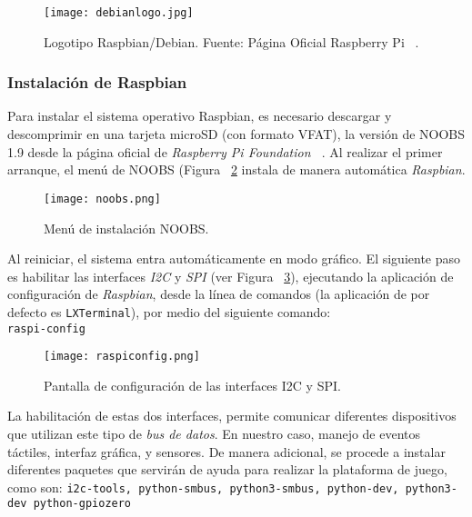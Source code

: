 \begin{figure}[!h]
\begin{center}
\texttt{[image: debianlogo.jpg]}
\caption{Logotipo Raspbian/Debian. Fuente: Página Oficial Raspberry Pi ~\cite{Raspberry}.}
\label{fig:MPU9255_PINOUT}
\end{center}
\end{figure}

\subsubsection{Instalación de Raspbian}
Para instalar el sistema operativo Raspbian, es necesario descargar y descomprimir en una tarjeta microSD (con formato VFAT), la versión de NOOBS 1.9 desde la página oficial de \emph{Raspberry Pi Foundation ~\cite{Noobs}}.
Al realizar el primer arranque, el menú de NOOBS (Figura ~\ref{fig:noobs} instala de manera automática \emph{Raspbian}.
\begin{figure}[!h]
\begin{center}
\texttt{[image: noobs.png]}
\caption{Menú de instalación NOOBS.}
\label{fig:noobs}
\end{center}
\end{figure}
Al reiniciar, el sistema entra automáticamente en modo gráfico. El siguiente paso es habilitar las interfaces \emph{I2C} y \emph{SPI} (ver Figura ~\ref{fig:raspiconfig}), ejecutando la aplicación de configuración de \emph{Raspbian}, desde la línea de comandos (la aplicación de por defecto es \texttt{LXTerminal}), por medio del siguiente comando:\\
\colorbox[gray]{0.85}{\texttt{raspi-config}}


\begin{figure}[!h]
\begin{center}
\texttt{[image: raspiconfig.png]}
\caption{Pantalla de configuración de las interfaces I2C y SPI.}
\label{fig:raspiconfig}
\end{center}
\end{figure}

La habilitación de estas dos interfaces, permite comunicar diferentes dispositivos que utilizan este tipo de \emph{bus de datos}. En nuestro caso, manejo de eventos táctiles, interfaz gráfica, y sensores.
De manera adicional, se procede a instalar diferentes paquetes que servirán de ayuda para realizar la plataforma de juego, como son: \texttt{i2c-tools, python-smbus, python3-smbus, python-dev, python3-dev python-gpiozero}

